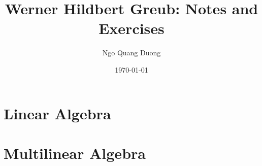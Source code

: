 \documentclass[12pt]{book}
\title{Werner Hildbert Greub: Notes and Exercises}
\author{Ngo Quang Duong}
\date{\today}
\begin{document}
\maketitle

\tableofcontents

\part{Linear Algebra}















\part{Multilinear Algebra}












\end{document}

